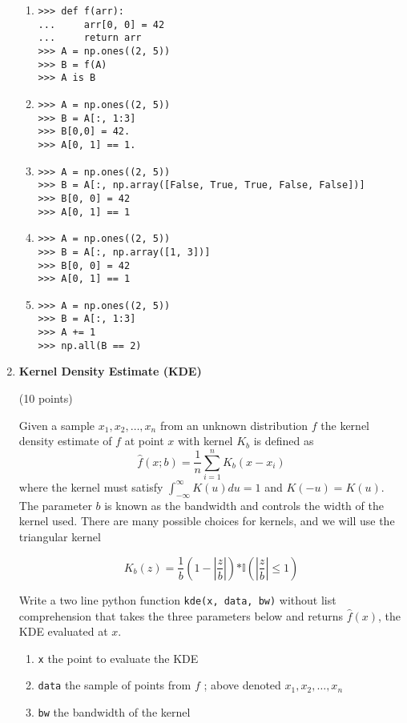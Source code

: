\documentclass{article}
\newcounter{points}
\newcommand\setpoints[1]{\addtocounter{points}{#1}(#1 points)}
\begin{document}
\begin{enumerate}
\begin{enumerate}
\item  

\begin{verbatim}
>>> def f(arr):
...     arr[0, 0] = 42
...     return arr
>>> A = np.ones((2, 5))
>>> B = f(A)
>>> A is B
\end{verbatim}

\item  

\begin{verbatim}
>>> A = np.ones((2, 5))
>>> B = A[:, 1:3]
>>> B[0,0] = 42.
>>> A[0, 1] == 1.
\end{verbatim}

\item  

\begin{verbatim}
>>> A = np.ones((2, 5))
>>> B = A[:, np.array([False, True, True, False, False])]
>>> B[0, 0] = 42
>>> A[0, 1] == 1
\end{verbatim}


\item  

\begin{verbatim}
>>> A = np.ones((2, 5))
>>> B = A[:, np.array([1, 3])]
>>> B[0, 0] = 42
>>> A[0, 1] == 1
\end{verbatim}

\item  

\begin{verbatim}
>>> A = np.ones((2, 5))
>>> B = A[:, 1:3]
>>> A += 1
>>> np.all(B == 2)
\end{verbatim}
\end{enumerate}


\newpage
\item \textbf{Kernel Density Estimate (KDE)} \setpoints{10}

Given a sample $x_1, x_2, \dots, x_n$ from an unknown distribution $f$ the kernel density estimate of $f$ at point $x$ with kernel $K_b$ is defined as 
$$\hat{f}(x;b) = \frac{1}{n}\sum_{i=1}^{n}K_b(x-x_i)$$
where the kernel must satisfy $\int_{-\infty}^{\infty}K(u)du = 1$ and $K(-u) = K(u).$ The parameter $b$ is known as the bandwidth and controls the width of the kernel used. There are many possible choices for kernels, and we will use the triangular kernel

$$K_{b}(z) = \frac{1}{b}(1 - |\frac{z}{b}|)\mathbb{*I}(|\frac{z}{b} |\leq 1)$$ 

Write a two line python function \texttt{kde(x, data, bw)} without list comprehension that takes the three parameters below and returns $\hat{f}(x)$, the KDE evaluated at $x$.
\begin{enumerate}
\item \texttt{x} the point to evaluate the KDE
\item \texttt{data}  the sample of points from $f$  ; above denoted $x_1, x_2, \dots, x_n$ 
\item \texttt{bw} the bandwidth of the kernel
\end{enumerate}


\end{enumerate}
\end{document}

